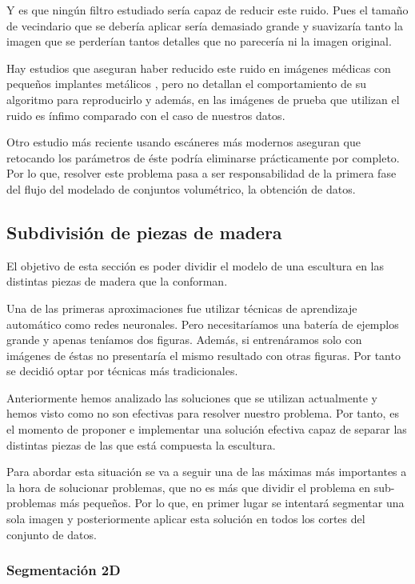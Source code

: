 Y es que ningún filtro estudiado sería capaz de reducir este ruido. Pues el tamaño de vecindario que se debería aplicar sería demasiado grande y suavizaría tanto la imagen que se perderían tantos detalles que no parecería ni la imagen original.

Hay estudios que aseguran haber reducido este ruido en imágenes médicas con pequeños implantes metálicos \cite{deman98} \cite{watzke04}, pero no detallan el comportamiento de su algoritmo para reproducirlo y además, en las imágenes de prueba que utilizan el ruido es ínfimo comparado con el caso de nuestros datos.

Otro estudio más reciente \cite{boas12} usando escáneres más modernos aseguran que retocando los parámetros de éste podría eliminarse prácticamente por completo. Por lo que, resolver este problema pasa a ser responsabilidad de la primera fase del flujo del modelado de conjuntos volumétrico, la obtención de datos.

\subsection{Subdivisión de piezas de madera}

El objetivo de esta sección es poder dividir el modelo de una escultura en las distintas piezas de madera que la conforman.

Una de las primeras aproximaciones fue utilizar técnicas de aprendizaje automático como redes neuronales. Pero necesitaríamos una batería de ejemplos grande y apenas teníamos dos figuras. Además, si entrenáramos solo con imágenes de éstas no presentaría el mismo resultado con otras figuras. Por tanto se decidió optar por técnicas más tradicionales. 

Anteriormente hemos analizado las soluciones que se utilizan actualmente y hemos visto como no son efectivas para resolver nuestro problema. Por tanto, es el momento de proponer e implementar una solución efectiva capaz de separar las distintas piezas de las que está compuesta la escultura.

Para abordar esta situación se va a seguir una de las máximas más importantes a la hora de solucionar problemas, que no es más que dividir el problema en sub-problemas más pequeños. Por lo que, en primer lugar se intentará segmentar una sola imagen y posteriormente aplicar esta solución en todos los cortes del conjunto de datos.

\subsubsection{Segmentación 2D}

